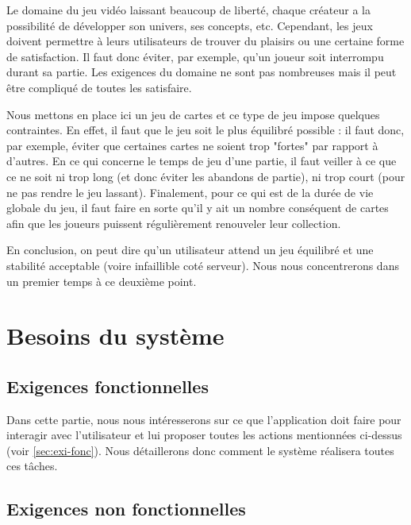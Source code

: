 \documentclass[11pt,a4paper]{article}
\begin{document}
Le domaine du jeu vidéo laissant beaucoup de liberté, chaque créateur a la possibilité de développer son univers, ses concepts, etc.  Cependant, les jeux doivent permettre à leurs utilisateurs de trouver du plaisirs ou une certaine forme de satisfaction.  Il faut donc éviter, par exemple, qu'un joueur soit interrompu durant sa partie.  Les exigences du domaine ne sont pas nombreuses mais il peut être compliqué de toutes les satisfaire.

\medbreak

Nous mettons en place ici un jeu de cartes et ce type de jeu impose quelques contraintes.  En effet, il faut que le jeu soit le plus équilibré possible : il faut donc, par exemple, éviter que certaines cartes ne soient trop "fortes" par rapport à d'autres.  En ce qui concerne le temps de jeu d'une partie, il faut veiller à ce que ce ne soit ni trop long (et donc éviter les abandons de partie), ni trop court (pour ne pas rendre le jeu lassant). Finalement, pour ce qui est de la durée de vie globale du jeu, il faut faire en sorte qu'il y ait un nombre conséquent de cartes afin que les joueurs puissent régulièrement renouveler leur collection.

\medbreak

En conclusion, on peut dire qu'un utilisateur attend un jeu équilibré et une stabilité acceptable (voire infaillible coté serveur).  Nous nous concentrerons dans un premier temps à ce deuxième point.



\section{Besoins du système}
\label{sec:besoins-sys}

\subsection{Exigences fonctionnelles}
\label{sec:exi-fonc-sys}

Dans cette partie, nous nous intéresserons sur ce que l'application doit
faire pour interagir avec l'utilisateur et lui proposer toutes les
actions mentionnées ci-dessus (voir \ref{sec:exi-fonc}). Nous détaillerons 
donc comment le système réalisera toutes ces tâches.


\subsection{Exigences non fonctionnelles}
\label{sec:exi-nonfonc-sys}
\end{document}
